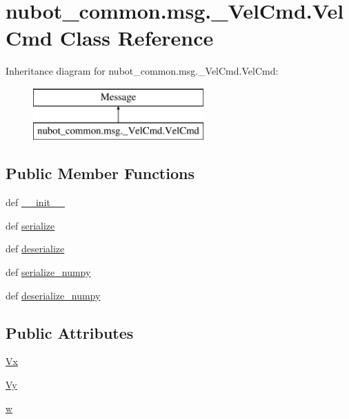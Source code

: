 \hypertarget{classnubot__common_1_1msg_1_1__VelCmd_1_1VelCmd}{\section{nubot\-\_\-common.\-msg.\-\_\-\-Vel\-Cmd.\-Vel\-Cmd Class Reference}
\label{classnubot__common_1_1msg_1_1__VelCmd_1_1VelCmd}
}
Inheritance diagram for nubot\-\_\-common.\-msg.\-\_\-\-Vel\-Cmd.\-Vel\-Cmd\-:\begin{figure}[H]
\begin{center}
\leavevmode
\includegraphics[height=2.000000cm]{classnubot__common_1_1msg_1_1__VelCmd_1_1VelCmd}
\end{center}
\end{figure}
\subsection*{Public Member Functions}
\begin{DoxyCompactItemize}
\item 
def \hyperlink{classnubot__common_1_1msg_1_1__VelCmd_1_1VelCmd_a980acd7a0deb55867ae1d60998f58a13}{\-\_\-\-\_\-init\-\_\-\-\_\-}
\item 
def \hyperlink{classnubot__common_1_1msg_1_1__VelCmd_1_1VelCmd_a66588ee765aef768ceeec2d239a0d0c0}{serialize}
\item 
def \hyperlink{classnubot__common_1_1msg_1_1__VelCmd_1_1VelCmd_ad52177e982b7f4989da163a10838bac7}{deserialize}
\item 
def \hyperlink{classnubot__common_1_1msg_1_1__VelCmd_1_1VelCmd_a9d32a14aacf7d7892d820efeaa30baae}{serialize\-\_\-numpy}
\item 
def \hyperlink{classnubot__common_1_1msg_1_1__VelCmd_1_1VelCmd_a77c19bc81cc3adc6f31bdb1516971434}{deserialize\-\_\-numpy}
\end{DoxyCompactItemize}
\subsection*{Public Attributes}
\begin{DoxyCompactItemize}
\item 
\hyperlink{classnubot__common_1_1msg_1_1__VelCmd_1_1VelCmd_a66ddd17ab2978517b122751dcaa30b52}{Vx}
\item 
\hyperlink{classnubot__common_1_1msg_1_1__VelCmd_1_1VelCmd_a972ff77ffe484e358aabf086e96721f9}{Vy}
\item 
\hyperlink{classnubot__common_1_1msg_1_1__VelCmd_1_1VelCmd_a3be3607dc9c4cd8133c6f4cc1d518b67}{w}
\end{DoxyCompactItemize}
